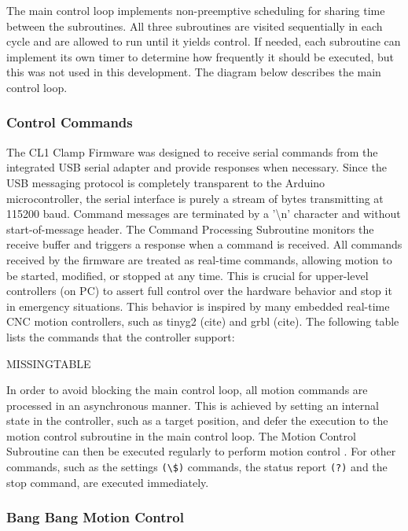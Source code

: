 The main control loop implements non-preemptive scheduling for sharing time between the subroutines. All three subroutines are visited sequentially in each cycle and are allowed to run until it yields control. If needed, each subroutine can implement its own timer to determine how frequently it should be executed, but this was not used in this development. The diagram below describes the main control loop.

\subsubsection{Control Commands}
\label{subsubsection:exploration-1-control-commands}

The CL1 Clamp Firmware was designed to receive serial commands from the integrated USB serial adapter and provide responses when necessary. Since the USB messaging protocol is completely transparent to the Arduino microcontroller, the serial interface is purely a stream of bytes transmitting at 115200 baud. Command messages are terminated by a '\textbackslash n' character and without start-of-message header. The Command Processing Subroutine monitors the receive buffer and triggers a response when a command is received.
All commands received by the firmware are treated as real-time commands, allowing motion to be started, modified, or stopped at any time. This is crucial for upper-level controllers (on PC) to assert full control over the hardware behavior and stop it in emergency situations. This behavior is inspired by many embedded real-time CNC motion controllers, such as tinyg2 (cite) and grbl (cite).
The following table lists the commands that the controller support:

MISSINGTABLE

In order to avoid blocking the main control loop, all motion commands are processed in an asynchronous manner. This is achieved by setting an internal state in the controller, such as a target position, and defer the execution to the motion control subroutine in the main control loop. The Motion Control Subroutine can then be executed regularly to perform motion control .
For other commands, such as the settings \verb|(\$)| commands, the status report \verb|(?)| and the stop command, are executed immediately. 

\subsubsection{Bang Bang Motion Control}
\label{subsubsection:exploration-1-bang-bang-motion-control}

